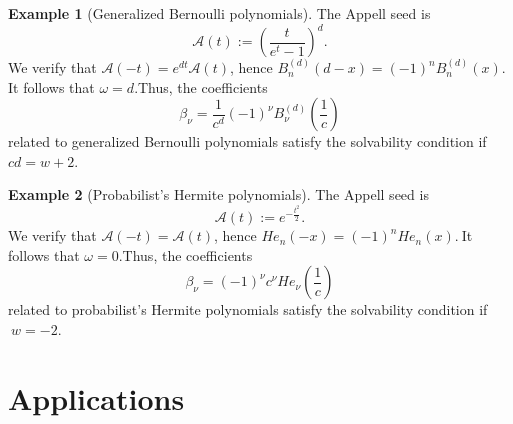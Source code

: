 \documentclass[10pt,reqno,a4paper]{amsart}%
\theoremstyle{definition}
\newtheorem{example}{Example}
\newcommand{\ap}{\ensuremath{\mathcal{A}}}%
\begin{document}
\begin{example}
[Generalized Bernoulli polynomials]The Appell seed is
\[
\ap(t):=\left(  \frac{t}{e^{t}-1}\right)  ^{d}.
\]
We verify that $\ap(-t)=e^{dt}\ap(t)$, hence $B_{n}^{\left(
d\right)  }\left(  d-x\right)  =\left(  -1\right)  ^{n}B_{n}^{\left(
d\right)  }\left(  x\right)  .\ $It follows that $\omega=d$.\newline Thus, the
coefficients
\[
\beta_{\nu}=\frac{1}{c^{d}}(-1)^{\nu}B_{\nu}^{(d)}\!\left(  \frac{1}%
{c}\right)
\]
related to generalized Bernoulli polynomials satisfy the solvability condition
if $cd=w+2$.
\end{example}

\begin{example}
[Probabilist's Hermite polynomials]\label{ex:GenHermitePoly} The Appell seed
is
\[
\ap(t):=e^{-\frac{t^{2}}{2}}.
\]
We verify that $\ap(-t)=\ap(t)$, hence $He_{n}\left(
-x\right)  =\left(  -1\right)  ^{n}He_{n}\left(  x\right)  .\ $It follows that
$\omega=0$.\newline Thus, the coefficients
\[
\beta_{\nu}=(-1)^{\nu}c^{\nu}He_{\nu}\left(  \frac{1}{c}\right)
\]
related to probabilist's Hermite polynomials satisfy the solvability condition
if $\ w=-2$.
\end{example}

\section{Applications\label{sec:Apps}}
\end{document}
